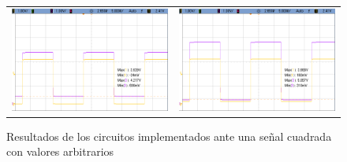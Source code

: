 \begin{figure}[H]
    \centering
    \begin{tabular}{c c}
        \includegraphics[scale=0.2]{../EJ5/Mediciones/Osciloscopio/LEVEL_SHIFTER/cropped_bjt.png} &
        \includegraphics[scale=0.2]{../EJ5/Mediciones/Osciloscopio/LEVEL_SHIFTER/cropped_mos.png} 
    \end{tabular}
    \caption{Resultados de los circuitos implementados ante una se\~nal cuadrada con valores arbitrarios}
    \label{fig:resultados_interfaces}
\end{figure}
